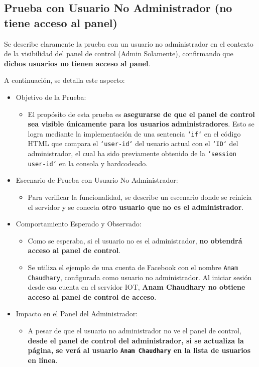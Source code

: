 \documentclass{report}
\begin{document}
\subsection{Prueba con Usuario No Administrador (no tiene acceso al panel)}
Se describe claramente la prueba con un usuario no administrador en el contexto de la visibilidad del panel de control (Admin Solamente), 
confirmando que \textbf{dichos usuarios no tienen acceso al panel}.

A continuación, se detalla este aspecto:
\begin{itemize}
    \item Objetivo de la Prueba:
    \begin{itemize}
        \item El propósito de esta prueba es \textbf{asegurarse de que el panel de control sea visible únicamente para los usuarios 
              administradores}. Esto se logra mediante la implementación de una sentencia \texttt{`if`} en el código HTML que compara el \texttt{`user-id`}
              del usuario actual con el \texttt{`ID`} del administrador, el cual ha sido previamente obtenido de la \texttt{`session user-id`} en la consola
              y hardcodeado.
    \end{itemize}

    \item Escenario de Prueba con Usuario No Administrador:
    \begin{itemize}
        \item Para verificar la funcionalidad, se describe un escenario donde se reinicia el servidor y se conecta \textbf{otro usuario que no es el 
              administrador}.
    \end{itemize}

    \item Comportamiento Esperado y Observado:
    \begin{itemize}
        \item Como se esperaba, si el usuario no es el administrador, \textbf{no obtendrá acceso al panel de control}.
        \item Se utiliza el ejemplo de una cuenta de Facebook con el nombre \texttt{Anam Chaudhary}, configurada como usuario no administrador. 
              Al iniciar sesión desde esa cuenta en el servidor IOT, \textbf{Anam Chaudhary no obtiene acceso al panel de control de acceso}.
    \end{itemize}

    \item Impacto en el Panel del Administrador:
    \begin{itemize}
        \item A pesar de que el usuario no administrador no ve el panel de control, \textbf{desde el panel de control del administrador, si se actualiza 
              la página, se verá al usuario \texttt{Anam Chaudhary} en la lista de usuarios en línea}.    
    \end{itemize}
    

\end{itemize}
\end{document}

